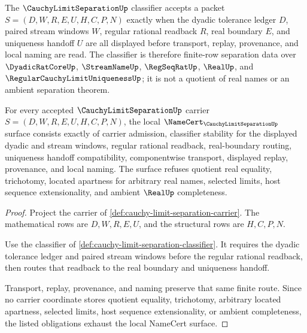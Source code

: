 \begin{definition}
\label{def:cauchy-limit-separation-classifier}
The $\CauchyLimitSeparationUp$ classifier accepts a packet $S=(D,W,R,E,U,H,C,P,N)$ exactly when the dyadic tolerance ledger $D$, paired stream windows $W$, regular rational readback $R$, real boundary $E$, and uniqueness handoff $U$ are all displayed before transport, replay, provenance, and local naming are read. The classifier is therefore finite-row separation data over $\DyadicRatCoreUp$, $\StreamNameUp$, $\RegSeqRatUp$, $\RealUp$, and $\RegularCauchyLimitUniquenessUp$; it is not a quotient of real names or an ambient separation theorem.
\end{definition}

\begin{theorem}
\label{thm:cauchy-limit-separation-namecert}
For every accepted $\CauchyLimitSeparationUp$ carrier $S=(D,W,R,E,U,H,C,P,N)$, the local $\NameCert_{\CauchyLimitSeparationUp}$ surface consists exactly of carrier admission, classifier stability for the displayed dyadic and stream windows, regular rational readback, real-boundary routing, uniqueness handoff compatibility, componentwise transport, displayed replay, provenance, and local naming. The surface refuses quotient real equality, trichotomy, located apartness for arbitrary real names, selected limits, host sequence extensionality, and ambient $\RealUp$ completeness.
\end{theorem}
\begin{proof}
Project the carrier of \autoref{def:cauchy-limit-separation-carrier}. The mathematical rows are $D,W,R,E,U$, and the structural rows are $H,C,P,N$.

Use the classifier of \autoref{def:cauchy-limit-separation-classifier}. It requires the dyadic tolerance ledger and paired stream windows before the regular rational readback, then routes that readback to the real boundary and uniqueness handoff.

Transport, replay, provenance, and naming preserve that same finite route. Since no carrier coordinate stores quotient equality, trichotomy, arbitrary located apartness, selected limits, host sequence extensionality, or ambient completeness, the listed obligations exhaust the local NameCert surface.
\end{proof}

